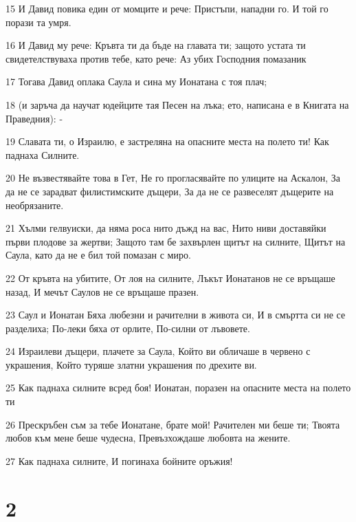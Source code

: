 \par 15 И Давид повика един от момците и рече: Пристъпи, нападни го. И той го порази та умря.
\par 16 И Давид му рече: Кръвта ти да бъде на главата ти; защото устата ти свидетелствуваха против тебе, като рече: Аз убих Господния помазаник
\par 17 Тогава Давид оплака Саула и сина му Ионатана с тоя плач;
\par 18 (и заръча да научат юдейците тая Песен на лъка; ето, написана е в Книгата на Праведния): -
\par 19 Славата ти, о Израилю, е застреляна на опасните места на полето ти! Как паднаха Силните.
\par 20 Не възвестявайте това в Гет, Не го прогласявайте по улиците на Аскалон, За да не се зарадват филистимските дъщери, За да не се развеселят дъщерите на необрязаните.
\par 21 Хълми гелвуиски, да няма роса нито дъжд на вас, Нито ниви доставяйки първи плодове за жертви; Защото там бе захвърлен щитът на силните, Щитът на Саула, като да не е бил той помазан с миро.
\par 22 От кръвта на убитите, От лоя на силните, Лъкът Ионатанов не се връщаше назад, И мечът Саулов не се връщаше празен.
\par 23 Саул и Ионатан Бяха любезни и рачителни в живота си, И в смъртта си не се разделиха; По-леки бяха от орлите, По-силни от лъвовете.
\par 24 Израилеви дъщери, плачете за Саула, Който ви обличаше в червено с украшения, Който туряше златни украшения по дрехите ви.
\par 25 Как паднаха силните всред боя! Ионатан, поразен на опасните места на полето ти
\par 26 Прескръбен съм за тебе Ионатане, брате мой! Рачителен ми беше ти; Твоята любов към мене беше чудесна, Превъзхождаше любовта на жените.
\par 27 Как паднаха силните, И погинаха бойните оръжия!

\chapter{2}


